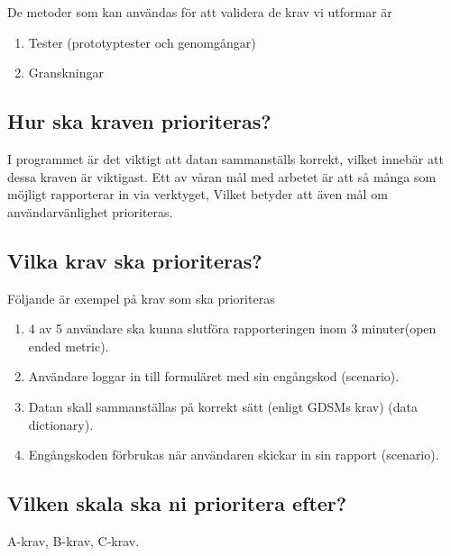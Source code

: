 \documentclass{article}
\begin{document}
De metoder som kan användas för att validera de krav vi utformar är
\begin{enumerate}
    \item Tester (prototyptester och genomgångar)
    \item Granskningar
\end{enumerate}

\subsection{Hur ska kraven prioriteras?}
I programmet är det viktigt att datan sammanställs korrekt, vilket innebär att dessa kraven är viktigast. Ett av våran mål med arbetet är att så många som möjligt rapporterar in via verktyget, Vilket betyder att även mål om användarvänlighet prioriteras. 

\subsection{Vilka krav ska prioriteras?}
Följande är exempel på krav som ska prioriteras
\begin{enumerate}
    \item 4 av 5 användare ska kunna slutföra rapporteringen inom 3 minuter(open ended metric).
    \item Användare loggar in till formuläret med sin engångskod (scenario).
    \item Datan skall sammanställas på korrekt sätt (enligt GDSMs krav) (data dictionary).
    \item Engångskoden förbrukas när användaren skickar in sin rapport (scenario).
\end{enumerate}
\subsection{Vilken skala ska ni prioritera efter?}
A-krav, B-krav, C-krav.





\end{document}
